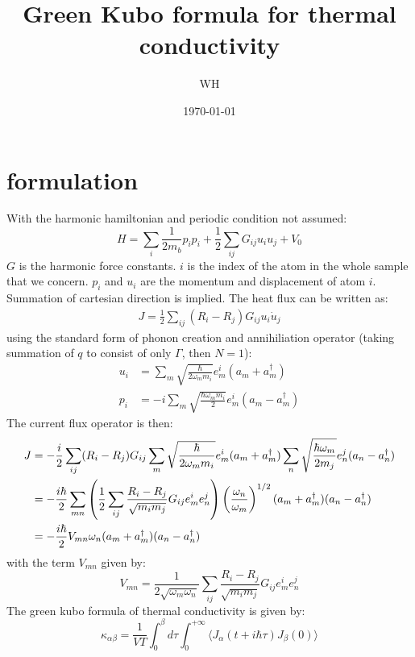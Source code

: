 \documentclass{article}
\begin{document}
\title{Green Kubo formula for thermal conductivity}
\author{WH}
\date{\today}
\maketitle

\section{formulation}
With the harmonic hamiltonian and periodic condition not assumed:
\begin{equation}
    H = \sum_{i} \frac{1}{2m_b} p_{i} p_{i} + \frac{1}{2} \sum_{ij} G_{ij} u_{i} u_{j} + V_0 \label{eq1}
\end{equation}
$G$ is the harmonic force constants. $i$ is the index of the atom in the whole sample that we concern. $p_i$ and $u_i$ are the 
momentum and displacement of atom $i$. Summation of cartesian direction is implied. 
The heat flux can be written as:
\begin{eqnarray}
    J = \frac{1}{2}\sum_{ij} (R_i - R_j) G_{ij} u_i \dot{u}_j
\end{eqnarray}
using the standard form of phonon creation and annihiliation operator (taking summation of $q$ to consist of 
only $\Gamma$, then $N = 1$):
\begin{align}
    u_i &= \sum_{m} \sqrt{ \frac{\hbar}{2\omega_m m_i} } e_{m}^i (a_m + a^{\dagger}_m) \\
    p_i &= -i \sum_{m} \sqrt{ \frac{\hbar \omega_m m_i}{2} } e_{m}^i (a_m - a^{\dagger}_m)
\end{align}
The current flux operator is then:
\begin{align}
    J & = -\frac{i}{2} \sum_{ij} (R_i - R_j) G_{ij} \sum_{m} \sqrt{ \frac{\hbar}{2\omega_m m_i} } e_{m}^i (a_m + a^{\dagger}_m)
    \sum_{n} \sqrt{ \frac{\hbar \omega_m}{2m_j} } e_{n}^j (a_n - a^{\dagger}_n) \notag \\
      & = -\frac{i\hbar}{2} \sum_{mn} \left( \frac{1}{2}\sum_{ij} \frac{R_i - R_j}{\sqrt{m_im_j}} G_{ij} e_m^i e_n^j \right) 
      \left(\frac{\omega_n}{\omega_m}\right)^{1/2} (a_m + a^{\dagger}_m)(a_n - a^{\dagger}_n) \notag \\
      & = -\frac{i\hbar}{2} V_{mn} \omega_n (a_m + a^{\dagger}_m)(a_n - a^{\dagger}_n)
\end{align}
with the term $V_{mn}$ given by:
\begin{equation}
    V_{mn} = \frac{1}{2\sqrt{\omega_m \omega_n}} \sum_{ij}\frac{R_i - R_j}{\sqrt{m_im_j}} G_{ij} e_m^i e_n^j
\end{equation}
The green kubo formula of thermal conductivity is given by:
\begin{equation}
    \kappa_{\alpha\beta} = 
    \frac{1}{VT} \int_0^{\beta} d\tau \int_0^{+\infty} \langle J_{\alpha}(t + i\hbar\tau) J_{\beta} (0) \rangle
\end{equation}
\end{document}
